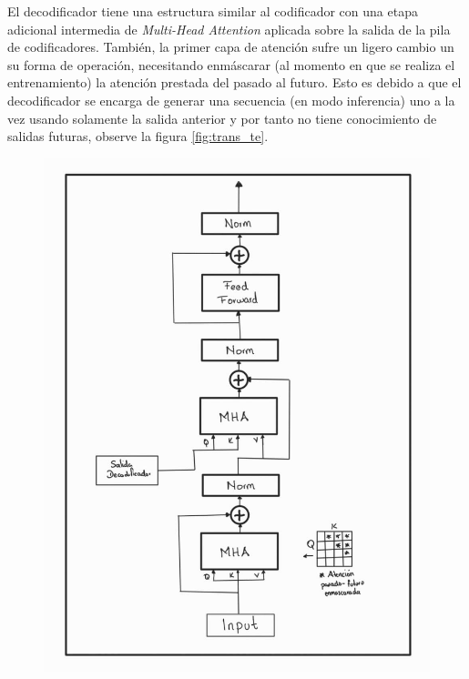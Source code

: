 El decodificador tiene una estructura similar al codificador con una etapa adicional intermedia
de \textit{Multi-Head Attention} aplicada sobre la salida de la pila de codificadores. También, la
primer capa de atención sufre un ligero cambio un su forma de operación, necesitando enmáscarar (al
momento en que se realiza el entrenamiento) la atención prestada del pasado al futuro. Esto es
debido a que el decodificador se encarga de generar una secuencia (en modo inferencia) uno a la vez
usando solamente la salida anterior y por tanto no tiene conocimiento de salidas futuras, observe
la figura \ref{fig:trans_te}.

\begin{figure}[ht!]
\centering
    \begin{minipage}{.4\textwidth}
        \centering
        \includegraphics[width=1.0 \textwidth]{Chapters/1. Transformer/Figures/transformer/decoder.jpg}
    \end{minipage}
    \begin{minipage}{.5\textwidth}

\end{minipage}
\end{figure}
